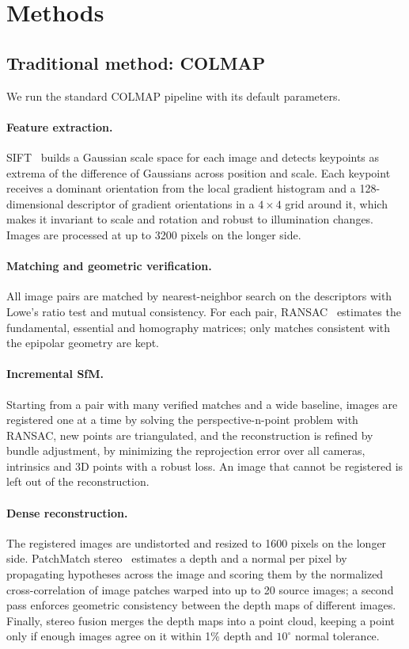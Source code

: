 \documentclass[10pt,twocolumn,letterpaper]{article}
\begin{document}
\section{Methods}

\subsection{Traditional method: COLMAP}
\label{sec:colmap}

We run the standard COLMAP pipeline with its default parameters.

\paragraph{Feature extraction.}
SIFT~\cite{lowe2004sift} builds a Gaussian scale space for each image and detects keypoints as extrema of the
difference of Gaussians across position and scale. Each keypoint receives a dominant orientation from the
local gradient histogram and a 128-dimensional descriptor of gradient orientations in a $4\times4$ grid around
it, which makes it invariant to scale and rotation and robust to illumination changes. Images are processed at
up to 3200 pixels on the longer side.

\paragraph{Matching and geometric verification.}
All image pairs are matched by nearest-neighbor search on the descriptors with Lowe's ratio test and mutual
consistency. For each pair, RANSAC~\cite{fischler1981ransac} estimates the fundamental, essential and
homography matrices; only matches consistent with the epipolar geometry are kept.

\paragraph{Incremental SfM.}
Starting from a pair with many verified matches and a wide baseline, images are registered one at a time by
solving the perspective-n-point problem with RANSAC, new points are triangulated, and the reconstruction is
refined by bundle adjustment, \ie by minimizing the reprojection error over all cameras, intrinsics and 3D
points with a robust loss. An image that cannot be registered is left out of the reconstruction.

\paragraph{Dense reconstruction.}
The registered images are undistorted and resized to 1600 pixels on the longer side. PatchMatch
stereo~\cite{schonberger2016mvs} estimates a depth and a normal per pixel by propagating hypotheses across the
image and scoring them by the normalized cross-correlation of image patches warped into up to 20 source images;
a second pass enforces geometric consistency between the depth maps of different images. Finally, stereo fusion
merges the depth maps into a point cloud, keeping a point only if enough images agree on it within 1\% depth and
$10^\circ$ normal tolerance.
\end{document}
